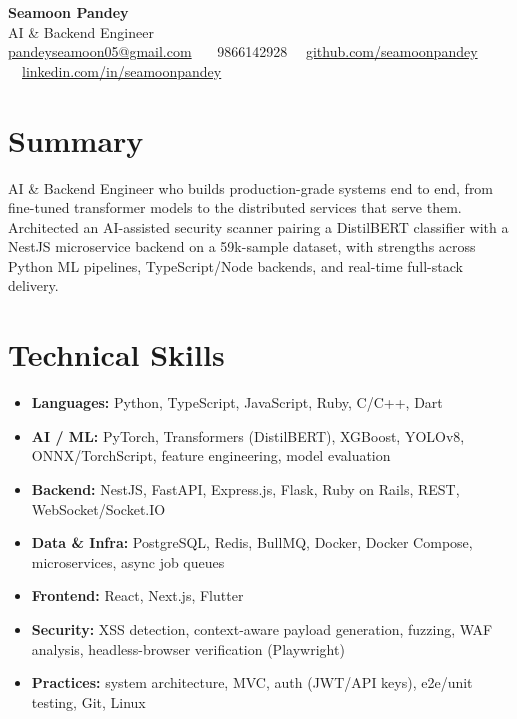 \documentclass[a4paper,10pt]{article}
\begin{document}
\begin{center}
{\LARGE \textbf{Seamoon Pandey}}\\[2pt]
{\color{rulegray}AI \& Backend Engineer}\\[3pt]
\href{mailto:pandeyseamoon05@gmail.com}{pandeyseamoon05@gmail.com} \ \textbar\ \ 9866142928 \ \textbar\
\href{https://github.com/seamoonpandey}{github.com/seamoonpandey} \ \textbar\
\href{https://www.linkedin.com/in/seamoonpandey/}{linkedin.com/in/seamoonpandey}
\end{center}

\section*{Summary}

AI \& Backend Engineer who builds production-grade systems end to end, from fine-tuned transformer models to the distributed services that serve them. Architected an AI-assisted security scanner pairing a DistilBERT classifier with a NestJS microservice backend on a 59k-sample dataset, with strengths across Python ML pipelines, TypeScript/Node backends, and real-time full-stack delivery.

\section*{Technical Skills}

\begin{itemize}
\item \textbf{Languages:} Python, TypeScript, JavaScript, Ruby, C/C++, Dart
\item \textbf{AI / ML:} PyTorch, Transformers (DistilBERT), XGBoost, YOLOv8, ONNX/TorchScript, feature engineering, model evaluation
\item \textbf{Backend:} NestJS, FastAPI, Express.js, Flask, Ruby on Rails, REST, WebSocket/Socket.IO
\item \textbf{Data \& Infra:} PostgreSQL, Redis, BullMQ, Docker, Docker Compose, microservices, async job queues
\item \textbf{Frontend:} React, Next.js, Flutter
\item \textbf{Security:} XSS detection, context-aware payload generation, fuzzing, WAF analysis, headless-browser verification (Playwright)
\item \textbf{Practices:} system architecture, MVC, auth (JWT/API keys), e2e/unit testing, Git, Linux
\end{itemize}
\end{document}
